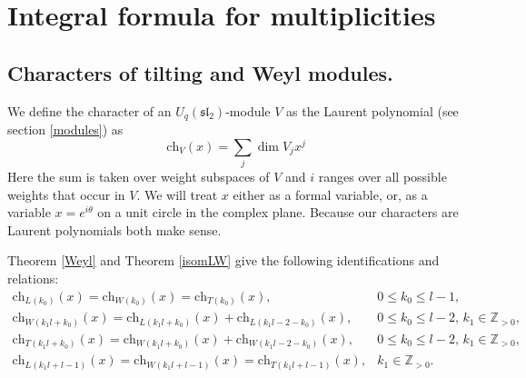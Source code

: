 \documentclass[11pt]{amsart}
\newcommand\lie[1]{\mathfrak{#1}}
\begin{document}
\section{Integral formula for multiplicities}\label{rec-int}
\subsection{Characters of tilting and Weyl modules.}
We define the character of an $U_q(\lie{sl}_2)$-module $V$ as the Laurent polynomial
(see section \ref{modules}) as
\[
\mathrm{ch}_V (x)=\sum_j \dim V_j x^j
\]
Here the sum is taken over weight subspaces of $V$ and $i$ ranges over all possible weights that occur in $V$. We will treat $x$ either as a formal variable, or, as a variable $x=e^{i\theta}$ on a unit circle in the complex plane. Because our characters are Laurent polynomials both make sense.

Theorem \ref{Weyl} and Theorem \ref{isomLW} give the following identifications and relations:
\begin{eqnarray*}
\mathrm{ch}_{L(k_0)}(x)=\mathrm{ch}_{W(k_0)}(x)=\mathrm{ch}_{T(k_0)}(x),& 0\leq k_0\leq l-1,\\
\mathrm{ch}_{W(k_1l+k_0)}(x)=\mathrm{ch}_{L(k_1l+k_0)}(x)+\mathrm{ch}_{L(k_1l-2-k_0)}(x),& 0\leq k_0\leq l-2,\,k_1\in\mathbb{Z}_{>0},\\
\mathrm{ch}_{T(k_1l+k_0)}(x)=\mathrm{ch}_{W(k_1l+k_0)}(x)+\mathrm{ch}_{W(k_1l-2-k_0)}(x),& 0\leq k_0\leq l-2,\,k_1\in\mathbb{Z}_{>0},\\
\mathrm{ch}_{L(k_1l+l-1)}(x)=\mathrm{ch}_{W(k_1l+l-1)}(x)=\mathrm{ch}_{T(k_1l+l-1)}(x),& k_1\in\mathbb{Z}_{>0}.
\end{eqnarray*}
\end{document}

